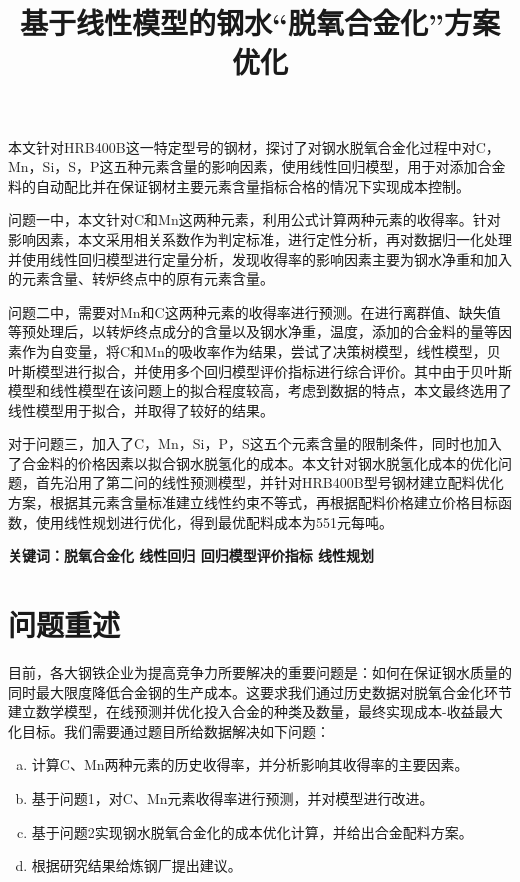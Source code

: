 \documentclass{xcumcmart}
\title{基于线性模型的钢水“脱氧合金化”方案优化}
\begin{document}
\renewcommand\arraystretch{2}

\maketitle
\begin{cnabstract}%
\setlength{\parskip}{1.4em} %

\par 本文针对HRB400B这一特定型号的钢材，探讨了对钢水脱氧合金化过程中对C，Mn，Si，S，P这五种元素含量的影响因素，使用线性回归模型，用于对添加合金料的自动配比并在保证钢材主要元素含量指标合格的情况下实现成本控制。
\par 问题一中，本文针对C和Mn这两种元素，利用公式计算两种元素的收得率。针对影响因素，本文采用相关系数作为判定标准，进行定性分析，再对数据归一化处理并使用线性回归模型进行定量分析，发现收得率的影响因素主要为钢水净重和加入的元素含量、转炉终点中的原有元素含量。
\par 问题二中，需要对Mn和C这两种元素的收得率进行预测。在进行离群值、缺失值等预处理后，以转炉终点成分的含量以及钢水净重，温度，添加的合金料的量等因素作为自变量，将C和Mn的吸收率作为结果，尝试了决策树模型，线性模型，贝叶斯模型进行拟合，并使用多个回归模型评价指标进行综合评价。其中由于贝叶斯模型和线性模型在该问题上的拟合程度较高，考虑到数据的特点，本文最终选用了线性模型用于拟合，并取得了较好的结果。
\par 对于问题三，加入了C，Mn，Si，P，S这五个元素含量的限制条件，同时也加入了合金料的价格因素以拟合钢水脱氢化的成本。本文针对钢水脱氢化成本的优化问题，首先沿用了第二问的线性预测模型，并针对HRB400B型号钢材建立配料优化方案，根据其元素含量标准建立线性约束不等式，再根据配料价格建立价格目标函数，使用线性规划进行优化，得到最优配料成本为551元每吨。
\par \textbf{关键词：脱氧合金化 线性回归 回归模型评价指标 线性规划}
\end{cnabstract}

\setlength{\parskip}{1.4em}
\setcounter{tocdepth}{2}
\setlength{\parskip}{1em} %
\tableofcontents
\newpage%
\setlength{\parskip}{1.4em} %
\section{问题重述}
\par 目前，各大钢铁企业为提高竞争力所要解决的重要问题是：如何在保证钢水质量的同时最大限度降低合金钢的生产成本。这要求我们通过历史数据对脱氧合金化环节建立数学模型，在线预测并优化投入合金的种类及数量，最终实现成本-收益最大化目标。我们需要通过题目所给数据解决如下问题：
\begin{enumerate}[(a)]%
\setlength{\itemindent}{2em}    %
\item 计算C、Mn两种元素的历史收得率，并分析影响其收得率的主要因素。
\item 基于问题1，对C、Mn元素收得率进行预测，并对模型进行改进。
\item 基于问题2实现钢水脱氧合金化的成本优化计算，并给出合金配料方案。
\item 根据研究结果给炼钢厂提出建议。
\end{enumerate}
\end{document}
